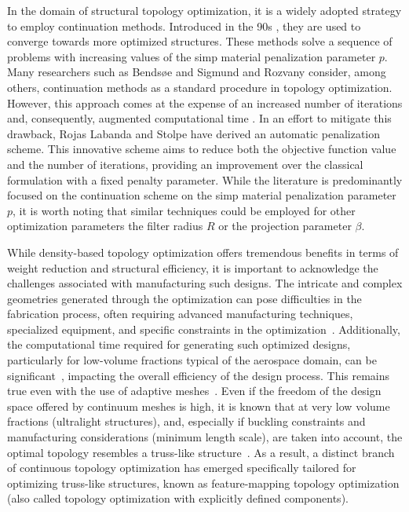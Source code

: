 In the domain of structural topology optimization, it is a widely adopted strategy to employ continuation methods. Introduced in the 90s , they are used to converge towards more optimized structures. These methods solve a sequence of problems with increasing values of the \gls{simp} material penalization parameter $p$. Many researchers such as Bendsøe and Sigmund  and Rozvany  consider, among others, continuation methods as a standard procedure in topology optimization. However, this approach comes at the expense of an increased number of iterations and, consequently, augmented computational time . In an effort to mitigate this drawback, Rojas Labanda and Stolpe  have derived an automatic penalization scheme. This innovative scheme aims to reduce both the objective function value and the number of iterations, providing an improvement over the classical formulation with a fixed penalty parameter. While the literature is predominantly focused on the continuation scheme on the \gls{simp} material penalization parameter $p$, it is worth noting that similar techniques could be employed for other optimization parameters \eg the filter radius $R$ or the projection parameter $\beta$.

While density-based topology optimization offers tremendous benefits in terms of weight reduction and structural efficiency, it is important to acknowledge the challenges associated with manufacturing such designs. The intricate and complex geometries generated through the optimization can pose difficulties in the fabrication process, often requiring advanced manufacturing techniques, specialized equipment, and specific constraints in the optimization~. Additionally, the computational time required for generating such optimized designs, particularly for low-volume fractions typical of the aerospace domain, can be significant~, impacting the overall efficiency of the design process. This remains true even with the use of adaptive meshes~. Even if the freedom of the design space offered by continuum meshes is high, it is known that at very low volume fractions (\eg ultralight structures), and, especially if buckling constraints and manufacturing considerations (\eg minimum length scale), are taken into account, the optimal topology resembles a truss-like structure~. As a result, a distinct branch of continuous topology optimization has emerged specifically tailored for optimizing truss-like structures, known as feature-mapping topology optimization (also called topology optimization with explicitly defined components).

